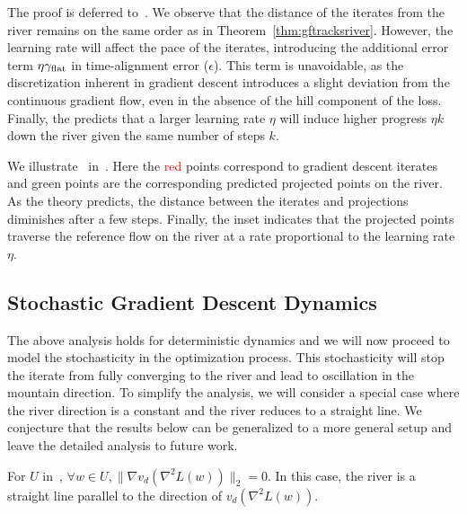 The proof is deferred to~. We observe that the distance of the iterates from the river remains on the same order as in Theorem~\ref{thm:gftracksriver}. However, the learning rate will affect the pace of the iterates, introducing the additional error term $\eta \gamma_{\mathrm{flat}}$ in time-alignment error ($\epsilon$). This term is unavoidable, as the discretization inherent in gradient descent introduces a slight deviation from the continuous gradient flow, even in the absence of the hill component of the loss. Finally, the 
 predicts that a larger learning rate $\eta$ will induce higher progress $\eta k$ down the river given the same number of steps $k$. 

We illustrate~ in~. Here the {\textcolor{red}{red}} points correspond to gradient descent iterates and {\textcolor[rgb]{0.0, 0.5, 0.0}{green}} points are the corresponding predicted projected points on the river. As the theory predicts, the distance between the iterates and projections diminishes after a few steps. Finally, the inset indicates that the projected points traverse the reference flow on the river at a rate proportional to the learning rate $\eta$.


\subsection{Stochastic Gradient Descent Dynamics}


The above analysis holds for deterministic dynamics and we will now proceed to model the stochasticity in the optimization process. This stochasticity will stop the iterate from fully converging to the river and lead to oscillation in the mountain direction. To simplify the analysis, we will consider a special case where the river direction is a constant and the river reduces to a straight line. We conjecture that the results below can be generalized to a more general setup and leave the detailed analysis to future work.

\begin{assumption}
\label{assum:straight}
For $U$ in~, $\forall w \in U, \| \nabla  v_d(\nabla^2 L(w)) \|_2  = 0$. In this case, the river is a straight line parallel to the direction of $v_d(\nabla^2 L(w))$.
\end{assumption}

